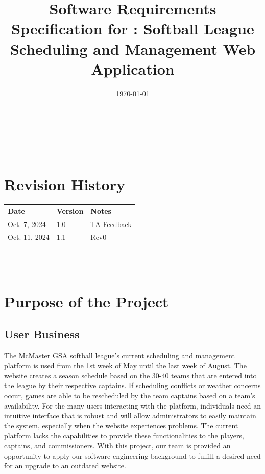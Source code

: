\documentclass[12pt]{article}
\begin{document}
\title{Software Requirements Specification for \progname: Softball League Scheduling and Management Web Application} 
\author{\authname}
\date{\today}
	
\maketitle

~\newpage


\tableofcontents

~\newpage

\section*{Revision History}

\begin{tabularx}{\textwidth}{p{3cm}p{2cm}X}
\toprule {\textbf{Date}} & {\textbf{Version}} & {\textbf{Notes}}\\
\midrule
Oct. 7, 2024 & 1.0 & TA Feedback\\
Oct. 11, 2024 & 1.1 & Rev0\\
\bottomrule
\end{tabularx}

~\\

~\newpage
\section{Purpose of the Project}

\subsection{User Business}

The McMaster GSA softball league's current scheduling and management platform
is used from the 1st week of May until the last week of August. The website
creates a season schedule based on the 30-40 teams that are entered into the
league by their respective captains. If scheduling conflicts or weather concerns
occur, games are able to be rescheduled by the team captains based on a team's
availability. For the many users interacting with the platform, individuals need
an intuitive interface that is robust and will allow administrators to easily
maintain the system, especially when the website experiences problems. The current
platform lacks the capabilities to provide these functionalities to the players,
captains, and commissioners. With this project, our team is provided an
opportunity to apply our software engineering background to fulfill a
desired need for an upgrade to an outdated website.
\end{document}
